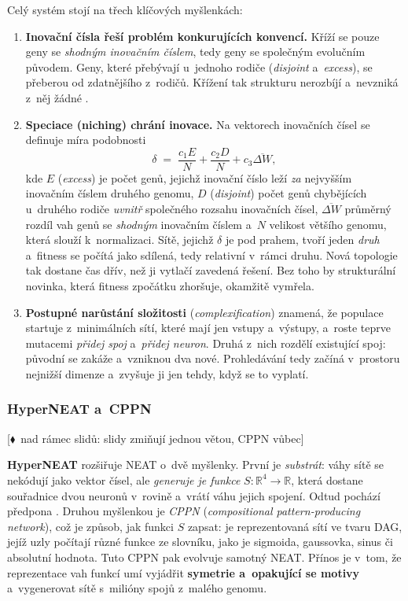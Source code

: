 \documentclass[11pt,a4paper]{article}
\theoremstyle{definition}
\newcommand{\mimoq}[1]{\textcolor{markcol}{\textsf{\footnotesize[$\blacklozenge$~nad rámec slidů: #1]}}}
\begin{document}
Celý systém stojí na třech klíčových myšlenkách:
\begin{enumerate}
\item \textbf{Inovační čísla řeší problém konkurujících konvencí.}
  Kříží se pouze geny se \emph{shodným inovačním číslem}, tedy geny se společným evolučním
  původem. Geny, které přebývají u~jednoho rodiče
  (\emph{disjoint} a~\emph{excess}), se přeberou od zdatnějšího z~rodičů.
  Křížení tak strukturu nerozbíjí a~nevzniká z~něj žádné .
\item \textbf{Speciace (niching) chrání inovace.} Na vektorech inovačních
  čísel se definuje míra podobnosti
  \[
  \delta \;=\; \frac{c_1 E}{N} + \frac{c_2 D}{N} + c_3 \overline{\Delta W},
  \]
  kde $E$ (\emph{excess}) je počet genů, jejichž inovační číslo leží
  \emph{za} nejvyšším inovačním číslem druhého genomu, $D$ (\emph{disjoint})
  počet genů chybějících u~druhého rodiče \emph{uvnitř} společného rozsahu
  inovačních čísel, $\overline{\Delta W}$ průměrný rozdíl vah genů se
  \emph{shodným} inovačním číslem a~$N$ velikost většího genomu, která slouží
  k~normalizaci. Sítě, jejichž $\delta$ je pod prahem, tvoří jeden \emph{druh}
  a~fitness se počítá jako sdílená, tedy relativní v~rámci druhu. Nová topologie
  tak dostane čas  dřív, než ji vytlačí zavedená řešení.
  Bez toho by strukturální novinka, která fitness zpočátku zhoršuje, okamžitě
  vymřela.
\item \textbf{Postupné narůstání složitosti} (\emph{complexification}) znamená, že
  populace startuje z~minimálních sítí, které mají jen vstupy a~výstupy, a~roste teprve
  mutacemi \emph{přidej spoj} a~\emph{přidej neuron}. Druhá z~nich rozdělí existující spoj:
  původní se zakáže a~vzniknou dva nové. Prohledávání tedy začíná
  v~prostoru nejnižší dimenze a~zvyšuje ji jen tehdy, když se to vyplatí.
\end{enumerate}

\subsubsection{HyperNEAT a~CPPN}

\noindent\mimoq{slidy zmiňují jednou větou, CPPN vůbec}

\textbf{HyperNEAT} rozšiřuje NEAT o~dvě myšlenky. První je \emph{substrát}: váhy sítě se
nekódují jako vektor čísel, ale \emph{generuje je funkce} $S : \mathbb{R}^4 \to \mathbb{R}$,
která dostane souřadnice dvou neuronů v~rovině a~vrátí váhu jejich spojení. Odtud pochází
předpona . Druhou myšlenkou je \emph{CPPN}
(\emph{compositional pattern-producing network}), což je způsob, jak funkci $S$ zapsat:
je reprezentovaná sítí ve tvaru DAG, jejíž uzly počítají různé funkce ze slovníku, jako je
sigmoida, gaussovka, sinus či absolutní hodnota. Tuto CPPN pak evolvuje samotný NEAT.
Přínos je v~tom, že reprezentace vah funkcí umí vyjádřit
\textbf{symetrie a~opakující se motivy} a~vygenerovat sítě s~milióny spojů z~malého
genomu.
\end{document}

